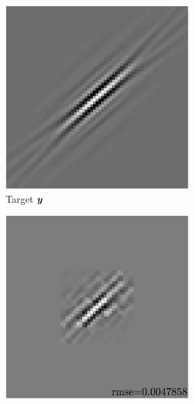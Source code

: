 \begin{figure}[!h]\centering
\begin{subfigure}[b]{0.8\textwidth}\centering
\begin{subfigure}[b]{0.49\textwidth}\centering
\includegraphics[width=\linewidth]{figures/xp/n4/xp_128x128_sc2_angl1_K3_S3_node4_target.pdf}
\caption{Target $\bm{y}$}
\end{subfigure}
\begin{subfigure}[b]{0.49\linewidth}\centering
\includegraphics[width=\linewidth]{figures/xp/n4/xp_128x128_sc2_angl1_K3_S3_node4_approx.pdf}

\end{subfigure}
\end{subfigure}
\end{figure}
